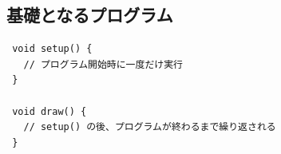 \documentclass[11pt,a4paper]{jarticle}
\begin{document}
\subsection*{基礎となるプログラム}

\begin{lstlisting}
 void setup() {
   // プログラム開始時に一度だけ実行
 }

 void draw() {
   // setup() の後、プログラムが終わるまで繰り返される
 }
\end{lstlisting}






 

\end{document}
